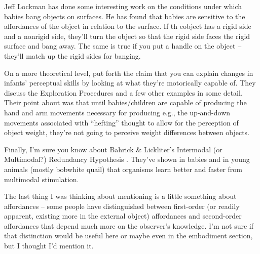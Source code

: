 Jeff Lockman has done some interesting work on the conditions under
which babies bang objects on surfaces.  He has found that babies are
sensitive to the affordances of the object in relation to the surface.
If th eobject has a rigid side and a nonrigid side, they'll turn the
object so that the rigid side faces the rigid surface and bang away.
The same is true if you put a handle on the object -- they'll match up
the rigid sides for banging.



On a more theoretical level, \cite{bushnell93motor} put forth the
claim that you can explain changes in infants' perceptual skills by
looking at what they're motorically capable of.  They discuss the
\cite{lederman87hand} Exploration Procedures and a few other examples in
some detail.  Their point about  was that until
babies/children are capable of producing the hand and arm movements
necessary for producing e.g., the up-and-down movements associated
with ``hefting'' thought to allow for the perception of object weight,
they're not going to perceive weight differences between objects.

Finally, I'm sure you know about Bahrick \& Lickliter's Intermodal (or
Multimodal?) Redundancy Hypothesis \cite{bahrick00intersensory}.  
They've shown in babies and in
young animals (mostly bobwhite quail) that organisms learn better and
faster from multimodal stimulation.



The last thing I was thinking about mentioning is a little something
about affordances -- some people have distinguished between
first-order (or readily apparent, existing more in the external
object) affordances and second-order affordances that depend much more
on the observer's knowledge.  I'm not sure if that distinction would
be useful here or maybe even in the embodiment section, but I thought
I'd mention it.

